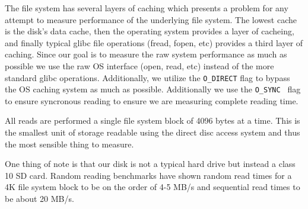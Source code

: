 The file system has several layers of caching which presents a problem for any attempt to measure performance of the underlying file system.
The lowest cache is the disk's data cache, then the operating system provides a layer of cacheing, and finally typical glibc file operations (fread, fopen, etc) provides a third layer of caching.
Since our goal is to measure the raw system performance as much as possible we use the raw OS interface (open, read, etc) instead of the more standard glibc operations.
Additionally, we utilize the {\tt O\_DIRECT} flag to bypass the OS caching system as much as possible.
Additionally we use the {\tt O\_SYNC } flag to ensure syncronous reading to ensure we are  measuring complete reading time.

All reads are performed a single file system block of 4096 bytes at a time.
This is the smallest unit of storage readable using the direct disc access system and thus the most sensible thing to measure.

One thing of note is that our disk is not a typical hard drive but instead a class 10 SD card.
Random reading benchmarks \cite{sdcard_2} have shown random read times for a 4K file system block to be on the order of 4-5 MB/s and sequential read times to be about 20 MB/s.